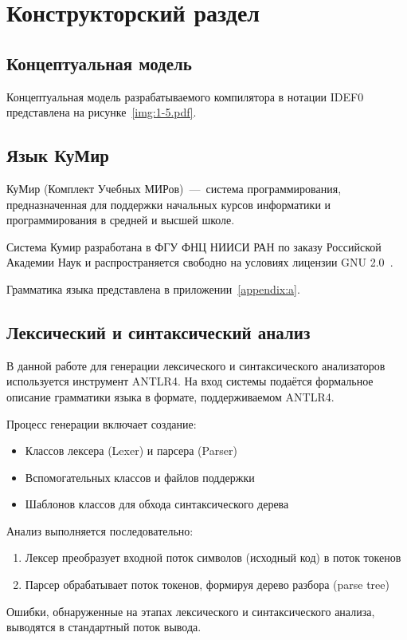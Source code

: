 \section{Конструкторский раздел}

\subsection{Концептуальная модель}

Концептуальная модель разрабатываемого компилятора в нотации IDEF0 представлена на рисунке~\ref{img:1-5.pdf}.


\subsection{Язык КуМир}

КуМир (Комплект Учебных МИРов)~---~система программирования, предназначенная для поддержки начальных курсов информатики и программирования в средней и высшей школе.

Система Кумир разработана в ФГУ ФНЦ НИИСИ РАН по заказу Российской Академии Наук и распространяется свободно на условиях лицензии GNU 2.0~\cite{kumir}.


Грамматика языка представлена в приложении~\ref{appendix:a}.

\subsection{Лексический и синтаксический анализ}
В данной работе для генерации лексического и синтаксического анализаторов используется инструмент \textsc{ANTLR4}. На вход системы подаётся формальное описание грамматики языка в формате, поддерживаемом \textsc{ANTLR4}.

Процесс генерации включает создание:
\begin{itemize}
    \item Классов лексера (Lexer) и парсера (Parser)
    \item Вспомогательных классов и файлов поддержки
    \item Шаблонов классов для обхода синтаксического дерева
\end{itemize}

Анализ выполняется последовательно:
\begin{enumerate}
    \item Лексер преобразует входной поток символов (исходный код) в поток токенов
    \item Парсер обрабатывает поток токенов, формируя дерево разбора (parse tree)
\end{enumerate}
Ошибки, обнаруженные на этапах лексического и синтаксического анализа, выводятся в стандартный поток вывода.

